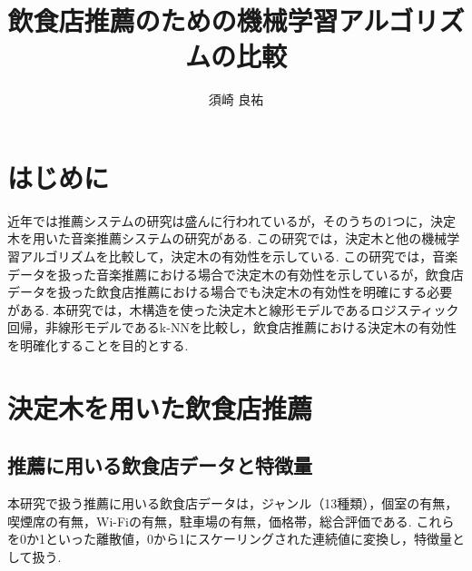 \documentclass[9pt,twocolumn]{jsarticle}
\begin{document}
\author{須崎 良祐}
\title{飲食店推薦のための機械学習アルゴリズムの比較}
\maketitle

\section{はじめに}
近年では推薦システムの研究は盛んに行われているが，そのうちの1つに，決定木を用いた音楽推薦システムの研究\cite{c}がある.
この研究では，決定木と他の機械学習アルゴリズムを比較して，決定木の有効性を示している. 
この研究では，音楽データを扱った音楽推薦における場合で決定木の有効性を示しているが，飲食店データを扱った飲食店推薦における場合でも決定木の有効性を明確にする必要がある. 
本研究では，木構造を使った決定木と線形モデルであるロジスティック回帰，非線形モデルであるk-NNを比較し，飲食店推薦における決定木の有効性を明確化することを目的とする.

\section{決定木を用いた飲食店推薦}
\subsection{推薦に用いる飲食店データと特徴量}
本研究で扱う推薦に用いる飲食店データは，ジャンル（13種類），個室の有無，喫煙席の有無，Wi-Fiの有無，駐車場の有無，価格帯，総合評価である.
これらを0か1といった離散値，0から1にスケーリングされた連続値に変換し，特徴量として扱う.
\end{document}
